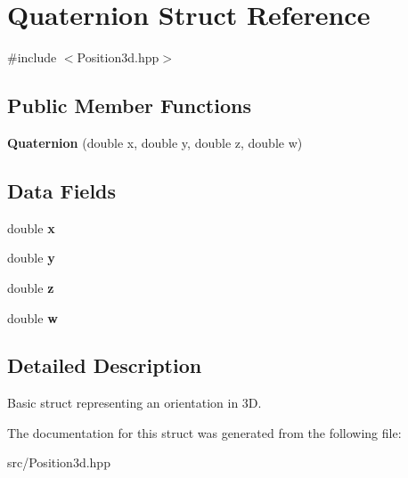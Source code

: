 \hypertarget{structQuaternion}{}\section{Quaternion Struct Reference}
\label{structQuaternion}


{\ttfamily \#include $<$Position3d.\+hpp$>$}

\subsection*{Public Member Functions}
\begin{DoxyCompactItemize}
\item 
\mbox{\label{structQuaternion_a9eb4fa0a424537a2925c1dd9d1077740}} 
{\bfseries Quaternion} (double x, double y, double z, double w)
\end{DoxyCompactItemize}
\subsection*{Data Fields}
\begin{DoxyCompactItemize}
\item 
\mbox{\label{structQuaternion_a65c93d8db6c57203447bd0594b608512}} 
double {\bfseries x}
\item 
\mbox{\label{structQuaternion_acfea23e3ba2b57356fe36b4d8f4c52f3}} 
double {\bfseries y}
\item 
\mbox{\label{structQuaternion_a90bbdb05526bddfbc3247dcc9a5cace4}} 
double {\bfseries z}
\item 
\mbox{\label{structQuaternion_aeded08fcb4e8d0866e612ed81cb44aa7}} 
double {\bfseries w}
\end{DoxyCompactItemize}


\subsection{Detailed Description}
Basic struct representing an orientation in 3D. 

The documentation for this struct was generated from the following file\+:\begin{DoxyCompactItemize}
\item 
src/Position3d.\+hpp\end{DoxyCompactItemize}
